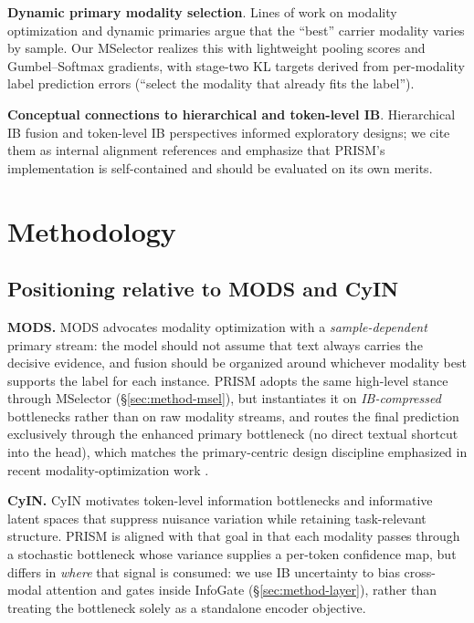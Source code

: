 \documentclass[11pt]{article}
\begin{document}
\noindent \textbf{Dynamic primary modality selection}.
Lines of work on modality optimization and dynamic primaries
\citep{mods2026align,yang2025improving} argue that the ``best'' carrier modality varies by sample.
Our MSelector realizes this with lightweight pooling scores and Gumbel--Softmax
gradients, with stage-two KL targets derived from per-modality label prediction
errors (``select the modality that already fits the label'').

\noindent \textbf{Conceptual connections to hierarchical and token-level IB}.
Hierarchical IB fusion \citep{ithp2024align} and token-level IB perspectives
\citep{cyin2025align} informed exploratory designs; we cite them as internal
alignment references and emphasize that PRISM's implementation is
self-contained and should be evaluated on its own merits.

\section{Methodology}
\label{sec:methodology}

\subsection{Positioning relative to MODS and CyIN}
\label{sec:mods-cyin-positioning}

\textbf{MODS.}
MODS \citep{mods2026align} advocates modality optimization with a
\emph{sample-dependent} primary stream: the model should not assume that text
always carries the decisive evidence, and fusion should be organized around
whichever modality best supports the label for each instance.
PRISM adopts the same high-level stance through MSelector
(\S\ref{sec:method-msel}), but instantiates it on \emph{IB-compressed}
bottlenecks rather than on raw modality streams, and routes the final
prediction exclusively through the enhanced primary bottleneck (no direct
textual shortcut into the head), which matches the primary-centric design
discipline emphasized in recent modality-optimization work
\citep{yang2025improving}.

\textbf{CyIN.}
CyIN \citep{cyin2025align} motivates token-level information bottlenecks and
informative latent spaces that suppress nuisance variation while retaining
task-relevant structure.
PRISM is aligned with that goal in that each modality passes through a
stochastic bottleneck whose variance supplies a per-token confidence map, but
differs in \emph{where} that signal is consumed: we use IB uncertainty to bias
cross-modal attention and gates inside InfoGate (\S\ref{sec:method-layer}),
rather than treating the bottleneck solely as a standalone encoder objective.
\end{document}
